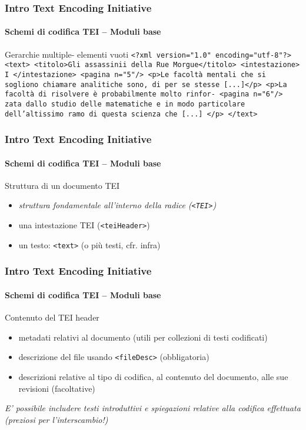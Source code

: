 \begin{frame}
	\frametitle{Intro Text Encoding Initiative}
	\framesubtitle{Schemi di codifica TEI – Moduli base}
	\addtocounter{nframe}{1}

	\begin{block}{Gerarchie multiple- elementi vuoti}
        \texttt{<?xml version="1.0" encoding="utf-8"?>
        <text>
        <titolo>Gli assassinii della Rue Morgue</titolo>
        <intestazione> I </intestazione>
        <pagina n="5"/>
        <p>Le facoltà mentali che si sogliono chiamare analitiche sono, di
        per se stesse [...]</p>
        <p>La facoltà di risolvere è probabilmente molto rinfor-
        <pagina n="6"/>
        zata dallo studio delle matematiche e in modo particolare
        dell’altissimo ramo di questa scienza che [...] </p> </text>}
       
    \end{block}
    
   

\end{frame}

\begin{frame}
	\frametitle{Intro Text Encoding Initiative}
	\framesubtitle{Schemi di codifica TEI – Moduli base}
	\addtocounter{nframe}{1}

	\begin{block}{Struttura di un documento TEI}
        \begin{itemize}
            \item \textit{struttura fondamentale all’interno della radice (\texttt{<TEI>})}
            \item una intestazione TEI (\texttt{<teiHeader>})
            \item un testo: \texttt{<text>} (o più testi, cfr. infra)
        \end{itemize}
    \end{block}
    
\end{frame}


\begin{frame}
	\frametitle{Intro Text Encoding Initiative}
	\framesubtitle{Schemi di codifica TEI – Moduli base}
	\addtocounter{nframe}{1}

    \begin{block}{Contenuto del TEI header}
        \begin{itemize}
            \item metadati relativi al documento (utili per collezioni di testi
            codificati)
            \item descrizione del file usando \texttt{<fileDesc>} (obbligatoria)
            \item descrizioni relative al tipo di codifica, al contenuto del
            documento, alle sue revisioni (facoltative)
        \end{itemize}
    \end{block}
\textit{E' possibile includere testi introduttivi e spiegazioni relative alla
codifica effettuata (preziosi per l’interscambio!)}

\end{frame}



